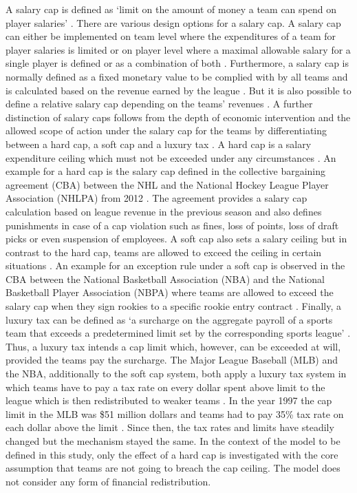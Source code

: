 \documentclass[12pt, a4paper]{article}
\begin{document}
A salary cap is defined as ‘limit on the amount of money a team can spend on player salaries’ \citep[p. ~1]{dietl_effect_2009}. There are various design options for a salary cap. A salary cap can either be implemented on team level where the expenditures of a team for player salaries is limited or on player level where a maximal allowable salary for a single player is defined or as a combination of both \citep{lindholm_problem_2011}. Furthermore, a salary cap is normally defined as a fixed monetary value to be complied with by all teams and is calculated based on the revenue earned by the league \citep{dietl_effect_2009}. But it is also possible to define a relative salary cap depending on the teams’ revenues \citep{dietl_salary_2012}. A further distinction of salary caps follows from the depth of economic intervention and the allowed scope of action under the salary cap for the teams by differentiating between a hard cap, a soft cap and a luxury tax \citep[see][]{levine_hard_1995,lindholm_problem_2011}. A hard cap is a salary expenditure ceiling which must not be exceeded under any circumstances \citep{levine_hard_1995}. An example for a hard cap is the salary cap defined in the collective bargaining agreement (CBA) between the NHL and the National Hockey League Player Association (NHLPA) from 2012 \citep[see][]{nhl_collective_2012}. The agreement provides a salary cap calculation based on league revenue in the previous season and also defines punishments in case of a cap violation such as fines, loss of points, loss of draft picks or even suspension of employees. A soft cap also sets a salary ceiling but in contrast to the hard cap, teams are allowed to exceed the ceiling in certain situations \citep{levine_hard_1995}. An example for an exception rule under a soft cap is observed in the CBA between the National Basketball Association (NBA) and the National Basketball Player Association (NBPA) where teams are allowed to exceed the salary cap when they sign rookies to a specific rookie entry contract \citep[p. ~207]{nba_collective_2017}. Finally, a luxury tax can be defined as ‘a surcharge on the aggregate payroll of a sports team that exceeds a predetermined limit set by the corresponding sports league’ \citep[p. ~1]{dietl_effect_2010}. Thus, a luxury tax intends a cap limit which, however, can be exceeded at will, provided the teams pay the surcharge. The Major League Baseball (MLB) and the NBA, additionally to the soft cap system, both apply a luxury tax system in which teams have to pay a tax rate on every dollar spent above limit to the league which is then redistributed to weaker teams \citep{dietl_effect_2010}. In the year 1997 the cap limit in the MLB was \$51 million dollars and teams had to pay 35\% tax rate on each dollar above the limit \citep{staudohar_salary_1998}. Since then, the tax rates and limits have steadily changed \citep[cf.][]{dietl_effect_2010} but the mechanism stayed the same. In the context of the model to be defined in this study, only the effect of a hard cap is investigated with the core assumption that teams are not going to breach the cap ceiling. The model does not consider any form of financial redistribution.
\end{document}
